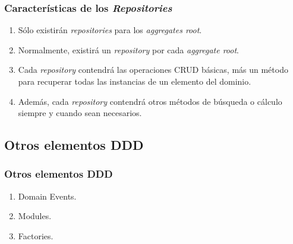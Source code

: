 \documentclass[a4paper,slidestop,xcolor=pst,dvips,blue]{beamer}
\begin{document}
\begin{frame}[c]
    \frametitle{Características de los \emph{Repositories}}
    \begin{enumerate}[<+->]
        \item Sólo existirán \emph{repositories} para los \emph{aggregates root}.
        \item Normalmente, existirá un \emph{repository} por cada \emph{aggregate root}.
        \item Cada \emph{repository} contendrá las operaciones CRUD básicas, más un método para recuperar todas las instancias de un elemento del dominio.
        \item Además, cada \emph{repository} contendrá otros métodos de búsqueda o cálculo siempre y cuando sean necesarios.
    \end{enumerate}
\end{frame}

\subsection{Otros elementos DDD}

\begin{frame}[c]
    \frametitle{Otros elementos DDD}
    \begin{enumerate}[<+->]
        \item Domain Events.
        \item Modules.
        \item Factories.
    \end{enumerate}
\end{frame}


%
%
\end{document}
